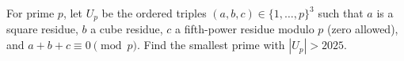 For prime $p$, let $U_p$ be the ordered triples $(a,b,c)\in\{1,\ldots,p\}^3$ such that $a$ is a square residue, $b$ a cube residue, $c$ a fifth-power residue modulo $p$ (zero allowed), and $a+b+c\equiv0\pmod p$. Find the smallest prime with $|U_p|>2025$.
